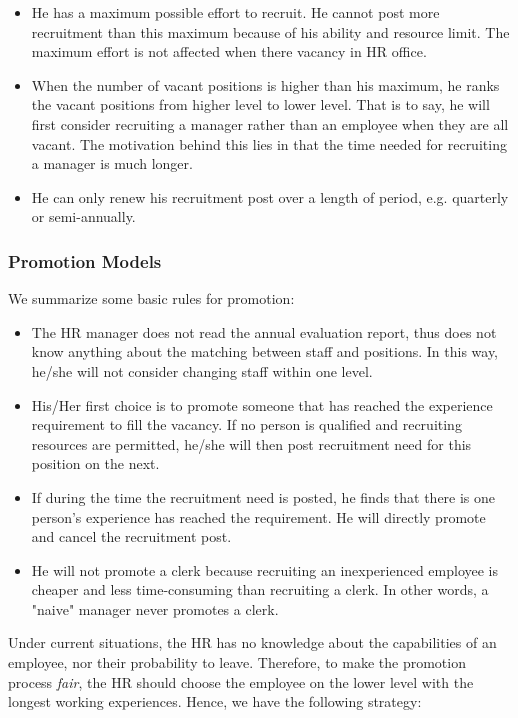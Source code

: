 \documentclass[tcn = 37075, sheet = false, abstract = false]{mcmthesis}
\begin{document}
\begin{itemize}
\item He has a maximum possible effort to recruit. He cannot post more recruitment than this maximum because of his ability and resource limit. The maximum effort is not affected when there vacancy in HR office. 
\item When the number of vacant positions is higher than his maximum, he ranks the vacant positions from higher level to lower level. That is to say, he will first consider recruiting a manager rather than an employee when they are all vacant. The motivation behind this lies in that the time needed for recruiting a manager is much longer.
\item He can only renew his recruitment post over a length of period, e.g. quarterly or semi-annually.
\end{itemize}

\subsubsection{Promotion Models}
We summarize some basic rules for promotion:
\begin{itemize}
\item The HR manager does not read the annual evaluation report, thus does not know anything about the matching between staff and positions. In this way, he/she will not consider changing staff within one level.
\item His/Her first choice is to promote someone that has reached the experience requirement to fill the vacancy. If no person is qualified and recruiting resources are permitted, he/she will then post recruitment need for this position on the next.
\item If during the time the recruitment need is posted, he finds that there is one person's experience has reached the requirement. He will directly promote and cancel the recruitment post.
\item He will not promote a clerk because recruiting an inexperienced employee is cheaper and less time-consuming than recruiting a clerk. In other words, a "naive" manager never promotes a clerk.
\end{itemize}

Under current situations, the HR has no knowledge about the capabilities of an employee, nor their probability to leave. Therefore, to make the promotion process \textit{fair}, the HR should choose the employee on the lower level with the longest working experiences. Hence, we have the following strategy:
\end{document}
